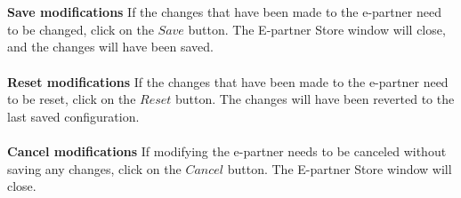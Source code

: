 \\\\
\textbf{Save modifications}
If the changes that have been made to the e-partner need to be changed, click on the $Save$ button. The E-partner Store window will close, and the changes will have been saved.
\\\\
\textbf{Reset modifications}
If the changes that have been made to the e-partner need to be reset, click on the $Reset$ button. The changes will have been reverted to the last saved configuration.
\\\\
\textbf{Cancel modifications}
If modifying the e-partner needs to be canceled without saving any changes, click on the $Cancel$ button. The E-partner Store window will close.
